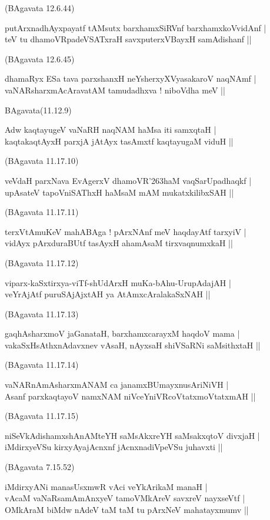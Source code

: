 \begin{itemize}
{\hfill{(BAgavata 12.6.44)}
\item[11.] putArxnadhAyxpayatf tAMsutx barxhamxSiRVnf barxhamxkoVvidAnf |\\
teV tu dhamoVRpadeVSATxraH savxputerxVBayxH samAdishanf ||

\hfill{(BAgavata 12.6.45)}
\item[12.] dhamaRyx ESa tava parxshanxH neYsherxyXVyasakaroV naqNAmf |\\\label{145}
vaNARsharxmAcAravatAM tamudadhxva ! niboVdha meV ||

\hfill{BAgavata(11.12.9)}
\item[13.] Adw kaqtayugeV vaNaRH naqNAM haMsa iti samxqtaH |\\
kaqtakaqtAyxH parxjA jAtAyx tasAmxtf kaqtayugaM viduH ||

\hfill{(BAgavata 11.17.10)}
\item[14.] veVdaH parxNava EvAgerxV dhamoVR\char'263haM vaqSarUpadhaqkf |\\
upAsateV tapoVniSAThxH haMsaM mAM mukatxkilibxSAH ||

\hfill{(BAgavata 11.17.11)}
\item[15.] terxVtAmuKeV mahABAga ! pArxNAnf meV haqdayAtf tarxyiV |\\
vidAyx pArxduraBUtf tasAyxH ahamAsaM tirxvaqnumxkaH ||

\hfill{(BAgavata 11.17.12)}
\item[16.] viparx-kaSxtirxya-viTf-shUdArxH muKa-bAhu-UrupAdajAH |\\
veYrAjAtf puruSAjAjxtAH ya AtAmxcAralakaSxNAH ||

\hfill{(BAgavata 11.17.13)}
\item[17.] gaqhAsharxmoV jaGanataH, barxhamxcarayxM haqdoV mama |\\
vakaSxHsAthxnAdavxnev vAsaH, nAyxsaH shiVSaRNi saMsithxtaH ||

\hfill{(BAgavata 11.17.14)}
\item[18.] vaNARnAmAsharxmANAM ca janamxBUmayxnusAriNiVH |\\
Asanf parxkaqtayoV namxNAM niVceYniVRcoVtatxmoVtatxmAH ||

\hfill{(BAgavata 11.17.15)}
\item[19.] niSeVkAdishamxshAnAMteYH saMsAkxreYH saMsakxqtoV divxjaH |\\
iMdirxyeVSu kirxyAyajAcnxnf jAcnxnadiVpeVSu juhavxti ||\label{146}

\hfill{(BAgavata 7.15.52)}}

{\bf
\item[20.] iMdirxyANi manasUsxmwR vAci veYkArikaM manaH |\\
vAcaM vaNaRsamAmAnxyeV tamoVMkAreV savxreV nayxseVtf |\\
OMkAraM biMdw nAdeV taM taM tu pArxNeV mahatayxmumv ||

}
\end{itemize}
